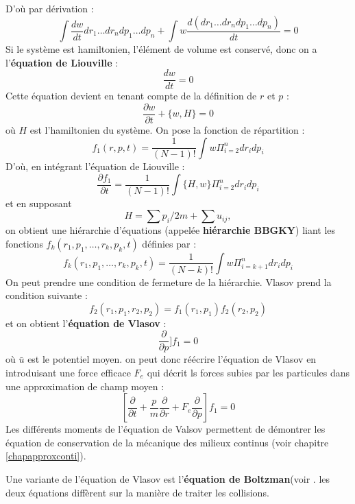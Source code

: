 \documentclass[12pt]{book}
\begin{document}
D'o\`u par d\'erivation :
\begin{equation}
\int \frac{dw}{dt} dr_1\dots dr_n dp_1\dots dp_n+\int w\frac{d
(dr_1\dots dr_n dp_1\dots dp_n)}{dt}=0 
\end{equation}
Si le syst\`eme est hamiltonien, l'\'el\'ement de volume est conserv\'e,
donc on a l'{\bf \'equation de Liouville} :
\begin{equation}
\frac{dw}{dt}=0
\end{equation}
Cette \'equation devient en tenant compte de la d\'efinition de $r$ et
$p$ : 
\begin{equation}
\frac{\partial w}{\partial t}+\{w,H\}=0
\end{equation}
o\`u $H$ est l'hamiltonien du syst\`eme. On pose la fonction de
r\'epartition : 
\begin{equation}
f_1(r,p,t)=\frac{1}{(N-1)!}\int w \Pi_{i=2}^n dr_idp_i
\end{equation}
D'o\`u, en int\'egrant l'\'equation de Liouville :
\begin{equation}
\frac{\partial f_1}{\partial t}=\frac{1}{(N-1)!}\int \{H,w\} \Pi_{i=2}^n dr_idp_i
\end{equation}
et en supposant 
\begin{equation}
H=\sum p_i/2m+\sum u_{ij},
\end{equation}
on obtient une hi\'erarchie d'\'equations (appel\'ee 
{\bf hi\'erarchie BBGKY}) liant les fonctions
$f_k(r_1,p_1,\dots,r_k,p_k,t)$ d\'efinies par :
\begin{equation}
f_k(r_1,p_1,\dots,r_k,p_k,t)=\frac{1}{(N-k)!}\int w \Pi_{i=k+1}^n
dr_idp_i
\end{equation} 
On peut prendre une condition de fermeture de la hi\'erarchie.
Vlasov prend la condition suivante :
\begin{equation}
f_2(r_1,p_1,r_2,p_2)=f_1(r_1,p_1)f_2(r_2,p_2)
\end{equation}
et on obtient l'{\bf \'equation de Vlasov} :
\begin{equation}
[\frac{\partial}{\partial t}+\frac{p}{m}\frac{\partial}{\partial r}+[F-\frac{\partial \bar{u}}{\partial r}]\frac{\partial }{\partial p}]f_1=0
\end{equation}
o\`u $\bar{u}$ est le potentiel moyen.
on peut donc r\'e\'ecrire l'\'equation de Vlasov en introduisant une force
efficace $F_e$ qui d\'ecrit ls forces subies par les particules dans une
approximation de champ moyen :
\begin{equation}\label{eqvlasov}
[\frac{\partial}{\partial t}+\frac{p}{m}\frac{\partial}{\partial r}+F_e\frac{\partial }{\partial p}]f_1=0
\end{equation}
Les diff\'erents moments de l'\'equation de Valsov permettent de
d\'emontrer les \'equation de conservation de la m\'ecanique des
milieux continus (voir chapitre \ref{chapapproxconti}).
\begin{rem}
Une variante de l'\'equation de Vlasov est l'{\bf \'equation de
Boltzman}(voir \cite{ph:physt:Diu89}. les deux \'equations
diff\`erent sur la mani\`ere de traiter les collisions.
\end{rem}
\end{document}
